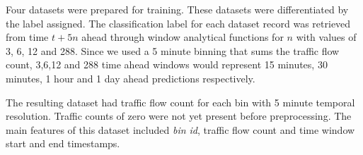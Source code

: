 \documentclass[12pt, a4paper]{report}
\theoremstyle{definition}
\theoremstyle{definition}%
\theoremstyle{definition}%
\theoremstyle{definition}%
\theoremstyle{definition}%
\theoremstyle{definition}%
\begin{document}
Four datasets were prepared for training. These datasets were differentiated by the label assigned. The classification label for each dataset record was retrieved from time $t+5n$ ahead through window analytical functions for $n$ with values of 3, 6, 12 and 288.  Since we used a 5 minute binning that sums the traffic flow count, 3,6,12 and 288  time ahead windows would represent 15 minutes, 30 minutes, 1 hour and 1 day ahead predictions respectively.


\begin{table}[h]	
	\centering
\caption{A sample of traffic flow count by bin for every 5 minute window.} 
\label{table:dataset_02}
\end{table}


The resulting dataset had traffic flow count for each bin with 5 minute temporal resolution. Traffic counts of zero were not yet present before preprocessing. The main features of this dataset included \textit{bin id}, traffic flow count and time window start and end timestamps. 
\end{document}
